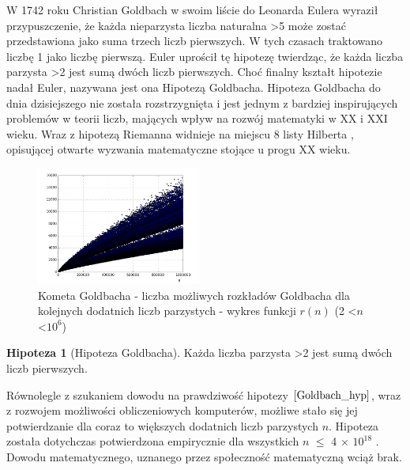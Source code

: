 \documentclass[10pt,onecolumn]{article}
\theoremstyle{definition}
\theoremstyle{hypothesis}
\newtheorem{hypothesis}{Hipoteza}
\theoremstyle{capability}
\begin{document}
W 1742 roku Christian Goldbach w swoim liście do Leonarda Eulera \cite{goldbach1742} wyraził przypuszczenie, że każda nieparzysta liczba naturalna \textgreater 5 może zostać przedstawiona jako suma trzech liczb pierwszych. W tych czasach traktowano liczbę 1 jako liczbę pierwszą. Euler uprościł tę hipotezę twierdząc, że każda liczba parzysta \textgreater 2 jest sumą dwóch liczb pierwszych. Choć finalny kształt hipotezie nadał Euler, nazywana jest ona Hipotezą Goldbacha. Hipoteza Goldbacha do dnia dzisiejszego nie została rozstrzygnięta i jest jednym z bardziej inspirujących problemów w teorii liczb, mających wpływ na rozwój matematyki w XX i XXI wieku. Wraz z hipotezą Riemanna widnieje na miejscu 8 listy Hilberta \cite{hilbert1900}, opisującej otwarte wyzwania matematyczne stojące u progu XX wieku.

\begin{figure}
  \begin{center}
    \includegraphics[width=0.48\textwidth]{f_goldbach_pairs}
  \end{center}
  \caption{Kometa Goldbacha - liczba możliwych rozkładów Goldbacha dla kolejnych dodatnich liczb parzystych - wykres funkcji $r(n)$ (2 \textless $n$ \textless $10^6$)}
  \label{fig:goldbach_pairs}
\end{figure}

\begin{hypothesis}[Hipoteza Goldbacha]
Każda liczba parzysta \textgreater 2 jest sumą dwóch liczb pierwszych.
\label{Goldbach_hyp}
\end{hypothesis}

Równolegle z szukaniem dowodu na prawdziwość hipotezy $\ref{Goldbach_hyp}$, wraz z rozwojem możliwości obliczeniowych komputerów, możliwe stało się jej potwierdzanie dla coraz to większych dodatnich liczb parzystych $n$. Hipoteza została dotychczas potwierdzona empirycznie dla wszystkich $n$ $\leq$ 4 $\times$ $10^{18}$ \cite{oliveira2012}. Dowodu matematycznego, uznanego przez społeczność matematyczną wciąż brak.\par
\end{document}
